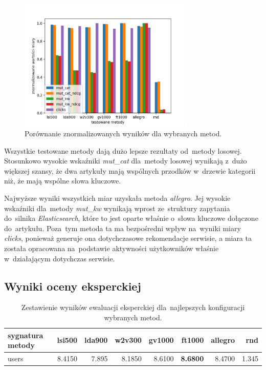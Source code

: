 \documentclass[pl]{minipw} %
\begin{document}
\begin{figure}[H]
	\centering
	\includegraphics[width=0.75\textwidth]{img/results/lsi500_lda900_w2v300_gv1000_ft1000_allegro_rnd_.png}
	\caption{Porównanie znormalizowanych wyników dla wybranych metod.}
\end{figure}

Wszystkie testowane metody dają dużo lepsze rezultaty od~metody losowej. Stosunkowo wysokie wskaźniki \textit{mut\_cat} dla~metody losowej wynikają z~dużo większej szansy, że dwa artykuły mają wspólnych przodków w~drzewie kategorii niż, że mają wspólne słowa kluczowe.

Najwyższe wyniki wszystkich miar uzyskała metoda \textit{allegro}. Jej wysokie wskaźniki dla~metody \textit{mut\_kw} wynikają wprost ze~struktury zapytania do~silnika \textit{Elasticsearch}, które to jest oparte właśnie o~słowa kluczowe dołączone do~artykułu. Poza~tym metoda ta ma bezpośredni wpływ na~wyniki miary \textit{clicks}, ponieważ generuje ona dotychczasowe rekomendacje serwisie, a miara ta została opracowana na~podstawie aktywności użytkowników właśnie w~działającym dotychczas serwisie.

\subsection{Wyniki oceny eksperckiej}

\begin{table}[H]
	\centering
	\begin{tabular}{lrrrrrrr}
		\hline
		sygnatura metody &   lsi500 &   lda900 &   w2v300 &   gv1000 &   ft1000 &   allegro &   rnd \\
		\hline
		users &    8.4150 &    7.895 &    8.1850 &     8.6100 &     \textbf{8.6800} &      8.4700 & 1.345 \\
		\hline
	\end{tabular}
	\caption{Zestawienie wyników ewaluacji eksperckiej dla~najlepszych konfiguracji wybranych metod.}
\end{table}
\end{document}
